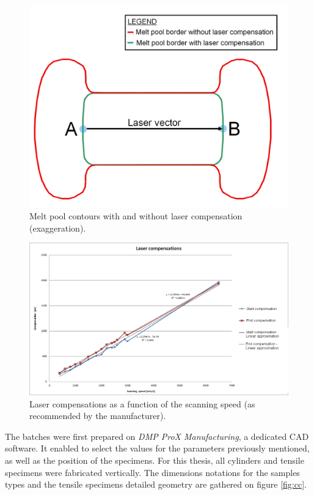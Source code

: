 \begin{figure}[ht]
\centering
\includegraphics[scale=0.3]{Images/Compens}
\decoRule
\caption[Melt pool contours with and without laser compensation (exaggeration)]{Melt pool contours with and without laser compensation (exaggeration).}
\label{fig:Compens}
\end{figure}

\begin{figure}[ht]
\centering
\includegraphics[scale=0.45]{Images/Compens1}
\decoRule
\caption[Laser compensations as a function of the scanning speed (as recommended by the manufacturer)]{Laser compensations as a function of the scanning speed (as recommended by the manufacturer).}
\label{fig:Compens1}
\end{figure}

The batches were first prepared on \textit{DMP ProX Manufacturing}, a dedicated CAD software. It enabled to select the values for the parameters previously mentioned, as well as the position of the specimens. For this thesis, all cylinders and tensile specimens were fabricated vertically. The dimensions notations for the samples types and the tensile specimens detailed geometry are gathered on figure \ref{fig:cc}. 


